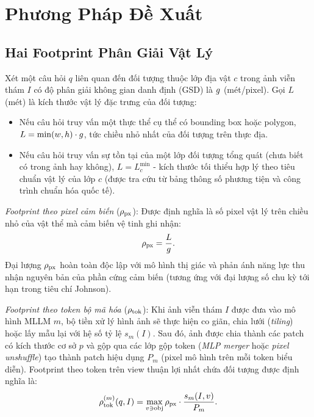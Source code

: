 \section{Phương Pháp Đề Xuất}
\label{sec:method}

\subsection{Hai Footprint Phân Giải Vật Lý}
Xét một câu hỏi $q$ liên quan đến đối tượng thuộc lớp địa vật $c$ trong ảnh viễn thám $I$ có độ phân giải không gian danh định (GSD) là $g$ (mét/pixel). Gọi $L$ (mét) là kích thước vật lý đặc trưng của đối tượng:
\begin{itemize}
    \item Nếu câu hỏi truy vấn một thực thể cụ thể có bounding box hoặc polygon, $L = \min(w, h) \cdot g$, tức chiều nhỏ nhất của đối tượng trên thực địa.
    \item Nếu câu hỏi truy vấn sự tồn tại của một lớp đối tượng tổng quát (chưa biết có trong ảnh hay không), $L = L_c^{\min}$ - kích thước tối thiểu hợp lý theo tiêu chuẩn vật lý của lớp $c$ (được tra cứu từ bảng thông số phương tiện và công trình chuẩn hóa quốc tế).
\end{itemize}

\textit{Footprint theo pixel cảm biến} ($\rho_{\mathrm{px}}$): Được định nghĩa là số pixel vật lý trên chiều nhỏ của vật thể mà cảm biến vệ tinh ghi nhận:
\begin{equation}
\rho_{\mathrm{px}} = \frac{L}{g}.
\label{eq:rhopx}
\end{equation}
Đại lượng $\rho_{\mathrm{px}}$ hoàn toàn độc lập với mô hình thị giác và phản ánh năng lực thu nhận nguyên bản của phần cứng cảm biến (tương ứng với đại lượng số chu kỳ tới hạn trong tiêu chí Johnson).

\textit{Footprint theo token bộ mã hóa} ($\rho_{\mathrm{tok}}$): Khi ảnh viễn thám $I$ được đưa vào mô hình MLLM $m$, bộ tiền xử lý hình ảnh sẽ thực hiện co giãn, chia lưới (\textit{tiling}) hoặc lấy mẫu lại với hệ số tỷ lệ $s_m(I)$. Sau đó, ảnh được chia thành các patch có kích thước cơ sở $p$ và gộp qua các lớp gộp token (\textit{MLP merger} hoặc \textit{pixel unshuffle}) tạo thành patch hiệu dụng $P_m$ (pixel mô hình trên mỗi token biểu diễn). Footprint theo token trên view thuận lợi nhất chứa đối tượng được định nghĩa là:
\begin{equation}
\rho_{\mathrm{tok}}^{(m)}(q, I) = \max_{v \ni \text{obj}} \rho_{\mathrm{px}} \cdot \frac{s_m(I, v)}{P_m}.
\label{eq:rhotok}
\end{equation}

